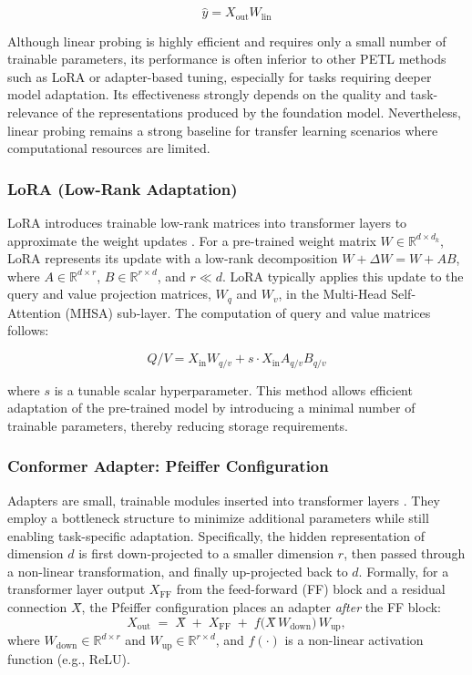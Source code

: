 \documentclass[11pt]{article}
\begin{document}
\begin{equation}
\hat{y} = X_{\text{out}} W_{\text{lin}}
\end{equation}

Although linear probing is highly efficient and requires only a small number of trainable parameters, its performance is often inferior to other PETL methods such as LoRA or adapter-based tuning, especially for tasks requiring deeper model adaptation. Its effectiveness strongly depends on the quality and task-relevance of the representations produced by the foundation model. Nevertheless, linear probing remains a strong baseline for transfer learning scenarios where computational resources are limited.

\subsubsection{LoRA (Low-Rank Adaptation)}
LoRA introduces trainable low-rank matrices into transformer layers to approximate the weight updates \cite{hu2021lora}. For a pre-trained weight matrix $W \in \mathbb{R}^{d \times d_k}$, LoRA represents its update with a low-rank decomposition $W + \Delta W = W + AB$, where $A \in \mathbb{R}^{d \times r}$, $B \in \mathbb{R}^{r \times d}$, and $r \ll d$. LoRA typically applies this update to the query and value projection matrices, $W_q$ and $W_v$, in the Multi-Head Self-Attention (MHSA) sub-layer. The computation of query and value matrices follows:

\begin{equation}
Q/V = X_{\text{in}} W_{q/v} + s \cdot X_{\text{in}} A_{q/v} B_{q/v}
\end{equation}

where $s$ is a tunable scalar hyperparameter. This method allows efficient adaptation of the pre-trained model by introducing a minimal number of trainable parameters, thereby reducing storage requirements.

\subsubsection{Conformer Adapter: Pfeiffer Configuration}
Adapters are small, trainable modules inserted into transformer layers \cite{he2021towards}. They employ a bottleneck structure to minimize additional parameters while still enabling task-specific adaptation. Specifically, the hidden representation of dimension $d$ is first down-projected to a smaller dimension $r$, then passed through a non-linear transformation, and finally up-projected back to $d$. Formally, for a transformer layer output $X_{\text{FF}}$ from the feed-forward (FF) block and a residual connection $X̂$, the Pfeiffer configuration places an adapter \emph{after} the FF block:
\begin{equation}
X_{\text{out}} \;=\; X̂ \;+\; X_{\text{FF}} \;+\; f\bigl(X̂\,W_{\text{down}}\bigr)\,W_{\text{up}},
\end{equation}
where $W_{\text{down}} \in \mathbb{R}^{d \times r}$ and $W_{\text{up}} \in \mathbb{R}^{r \times d}$, and $f(\cdot)$ is a non-linear activation function (e.g., ReLU). 
\end{document}
